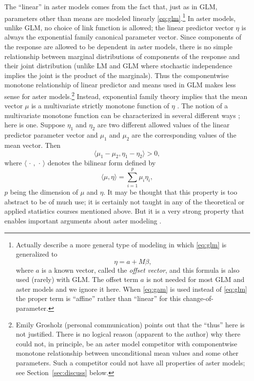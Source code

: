 \documentclass[11pt]{article}
\newcommand{\inner}[1]{\langle #1 \rangle}
\newcommand{\fatdot}{\,\cdot\,}
\begin{document}
The ``linear'' in aster models comes from the fact that, just as in GLM,
parameters other than means are modeled linearly
\eqref{eq:glm}.\footnote{Actually \citet{gws} describe a more general type
of modeling in which \eqref{eq:glm} is generalized to \label{foot:affine}
\begin{equation} \label{eq:gam}
   \eta = a + M \beta,
\end{equation}
where $a$ is a known vector, called the \emph{offset vector},
and this formula is
also used (rarely) with GLM.  The offset term $a$ is not needed for most
GLM and aster models and we ignore it here.  When \eqref{eq:gam} is used
instead of \eqref{eq:glm} the proper term is ``affine'' rather than ``linear''
for this change-of-parameter.}
In aster
models, unlike GLM, no choice of link function is allowed;
the linear predictor vector $\eta$ is always the exponential
family canonical parameter vector.  Since components of the
response are allowed to be dependent in aster models, there is no simple
relationship between marginal distributions of components of the response
and their joint distribution (unlike LM and GLM where stochastic independence
implies the joint is the product of the marginals).  Thus the componentwise
monotone relationship of linear predictor and means used in GLM makes less sense
for aster models.\footnote{Emily Grosholz (personal communication) points out
that the ``thus'' here is not justified.  There is no logical reason
(apparent to the author) why there
could not, in principle, be an aster model competitor with componentwise
monotone relationship between unconditional mean values and some other
parameters.  Such a competitor could not have all properties of aster models;
see Section~\ref{sec:discuss} below.}
Instead, exponential family theory implies that the mean
vector $\mu$ is a multivariate strictly monotone function of $\eta$
\citep[p.~121]{barndorff}.
The notion of a multivariate monotone function can be characterized in several
different ways \citep[Chapter~12]{raw}; here is one.
Suppose $\eta_1$ and $\eta_2$ are two different allowed values of the linear
predictor parameter vector and $\mu_1$ and $\mu_2$ are the corresponding
values of the mean vector.  Then
$$
   \inner{\mu_1 - \mu_2, \eta_1 - \eta_2} > 0,
$$
where $\inner{\fatdot, \fatdot}$ denotes the bilinear form defined by
\begin{equation} \label{eq:bilinear}
   \inner{\mu, \eta} = \sum_{i = 1}^p \mu_i \eta_i,
\end{equation}
$p$ being the dimension of $\mu$ and $\eta$.
It may be thought that this property is too abstract to be of much use;
it is certainly not taught in any of the theoretical or applied statistics
courses mentioned above.  But it is a very strong property that enables
important arguments about aster modeling
\citep[appendix on monotonicity; see also Section~\ref{sec:moron}
below]{aster3}.
\end{document}
